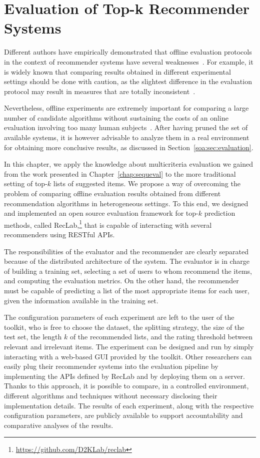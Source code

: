 \chapter{Evaluation of Top-k Recommender Systems}
\graphicspath{{Chapter05/Figures/}}
\label{chap:reclab}

Different authors have empirically demonstrated that offline evaluation protocols in the context of recommender systems have several weaknesses~\cite{Said2014}. For example, it is widely known that comparing results obtained in different experimental settings should be done with caution, as the slightest difference in the evaluation protocol may result in measures that are totally inconsistent~\cite{Jannach2015}.

Nevertheless, offline experiments are extremely important for comparing a large number of candidate algorithms without sustaining the costs of an online evaluation involving too many human subjects~\cite{Gunawardana2015}. After having pruned the set of available systems, it is however advisable to analyze them in a real environment for obtaining more conclusive results, as discussed in Section~\ref{soa:sec:evaluation}.

In this chapter, we apply the knowledge about multicriteria evaluation we gained from the work presented in Chapter~\ref{chap:sequeval} to the more traditional setting of top-$k$ lists of suggested items. We propose a way of overcoming the problem of comparing offline evaluation results obtained from different recommendation algorithms in heterogeneous settings. To this end, we designed and implemented an open source evaluation framework for top-$k$ prediction methods, called RecLab,\footnote{\url{https://github.com/D2KLab/reclab}} that is capable of interacting with several recommenders using RESTful APIs.

The responsibilities of the evaluator and the recommender are clearly separated because of the distributed architecture of the system. The evaluator is in charge of building a training set, selecting a set of users to whom recommend the items, and computing the evaluation metrics. On the other hand, the recommender must be capable of predicting a list of the most appropriate items for each user, given the information available in the training set.

The configuration parameters of each experiment are left to the user of the toolkit, who is free to choose the dataset, the splitting strategy, the size of the test set, the length $k$ of the recommended lists, and the rating threshold between relevant and irrelevant items. The experiment can be designed and run by simply interacting with a web-based GUI provided by the toolkit. Other researchers can easily plug their recommender systems into the evaluation pipeline by implementing the APIs defined by RecLab and by deploying them on a server. Thanks to this approach, it is possible to compare, in a controlled environment, different algorithms and techniques without necessary disclosing their implementation details. The results of each experiment, along with the respective configuration parameters, are publicly available to support accountability and comparative analyses of the results.

